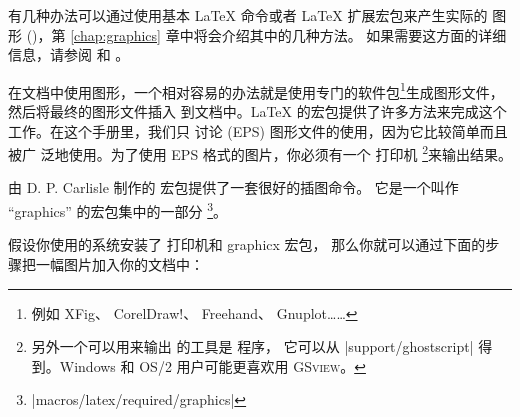 有几种办法可以通过使用基本 \LaTeX{} 命令或者 \LaTeX{} 扩展宏包来产生实际的
图形 ()，第 \ref{chap:graphics} 章中将会介绍其中的几种方法。
如果需要这方面的详细信息，请参阅 \companion{} 和 \manual{}。


在文档中使用图形，一个相对容易的办法就是使用专门的软件包\footnote{例如 XFig、
CorelDraw!、 Freehand、
Gnuplot……}生成图形文件，然后将最终的图形文件插入
到文档中。\LaTeX{} 的宏包提供了许多方法来完成这个工作。在这个手册里，我们只
讨论 \EPSi{} (EPS) 图形文件的使用，因为它比较简单而且被广
泛地使用。为了使用 EPS 格式的图片，你必须有一个 \PSi 打印机
\footnote{另外一个可以用来输出 \PSi{} 的工具是 \textsc{} 程序，
它可以从 \CTANref|support/ghostscript| 得到。Windows 和 OS/2 
用户可能更喜欢用 \textsc{GSview}。}来输出结果。


由 D. P. Carlisle 制作的  宏包提供了一套很好的插图命令。
它是一个叫作 ``graphics'' 的宏包集中的一部分
\footnote{\CTANref|macros/latex/required/graphics|}。


假设你使用的系统安装了 \PSi{} 打印机和 \textsf{graphicx} 宏包，
那么你就可以通过下面的步骤把一幅图片加入你的文档中：


